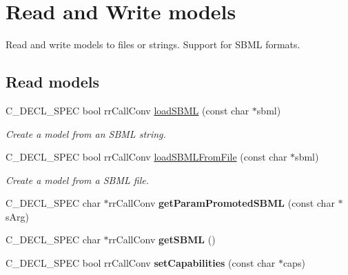 \hypertarget{group__loadsave}{
\section{\-Read and \-Write models}
\label{group__loadsave}
}


\-Read and write models to files or strings. \-Support for \-S\-B\-M\-L formats.  


\subsection*{\-Read models}
\begin{DoxyCompactItemize}
\item 
\-C\-\_\-\-D\-E\-C\-L\-\_\-\-S\-P\-E\-C bool rr\-Call\-Conv \hyperlink{group__loadsave_ga4105f02dfdb959175f30cecebfb1c081}{load\-S\-B\-M\-L} (const char $\ast$sbml)
\begin{DoxyCompactList}\small\item\em \-Create a model from an \-S\-B\-M\-L string. \end{DoxyCompactList}\item 
\-C\-\_\-\-D\-E\-C\-L\-\_\-\-S\-P\-E\-C bool rr\-Call\-Conv \hyperlink{group__loadsave_ga3147e10d84bddb6435bee4b1db0514bf}{load\-S\-B\-M\-L\-From\-File} (const char $\ast$sbml)
\begin{DoxyCompactList}\small\item\em \-Create a model from a \-S\-B\-M\-L file. \end{DoxyCompactList}\item 
\hypertarget{group__loadsave_ga4add8092e50aedd665cd073133838620}{
\-C\-\_\-\-D\-E\-C\-L\-\_\-\-S\-P\-E\-C char $\ast$rr\-Call\-Conv {\bfseries get\-Param\-Promoted\-S\-B\-M\-L} (const char $\ast$s\-Arg)}
\label{group__loadsave_ga4add8092e50aedd665cd073133838620}

\item 
\hypertarget{group__loadsave_ga05a79ded419b52fa2965fce1700c0e82}{
\-C\-\_\-\-D\-E\-C\-L\-\_\-\-S\-P\-E\-C char $\ast$rr\-Call\-Conv {\bfseries get\-S\-B\-M\-L} ()}
\label{group__loadsave_ga05a79ded419b52fa2965fce1700c0e82}

\item 
\hypertarget{group__loadsave_ga320ffeeba3e5505371b52ce61715bf82}{
\-C\-\_\-\-D\-E\-C\-L\-\_\-\-S\-P\-E\-C bool rr\-Call\-Conv {\bfseries set\-Capabilities} (const char $\ast$caps)}
\label{group__loadsave_ga320ffeeba3e5505371b52ce61715bf82}


\end{DoxyCompactItemize}
